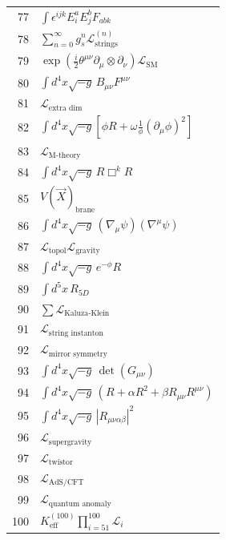 \documentclass[12pt,a4paper]{article}
\begin{document}
\begin{longtable}{r p{}}
		77 & \(\displaystyle \int \epsilon^{ijk}E_i^a E_j^b F_{ab k}\) \\
		78 & \(\displaystyle \sum_{n=0}^\infty g_s^n \mathcal{L}^{(n)}_{\text{strings}}\) \\
		79 & \(\displaystyle \exp\left(\frac{i}{2}\theta^{\mu\nu}\partial_\mu\otimes\partial_\nu\right)\mathcal{L}_{\text{SM}}\) \\
		80 & \(\displaystyle \int d^4x\sqrt{-g}\,B_{\mu\nu}F^{\mu\nu}\) \\
		81 & \(\displaystyle \mathcal{L}_{\text{extra dim}}\) \\
		82 & \(\displaystyle \int d^4x\sqrt{-g}\left[\phi R + \omega\frac{1}{\phi}(\partial_\mu\phi)^2\right]\) \\
		83 & \(\displaystyle \mathcal{L}_{\text{M-theory}}\) \\
		84 & \(\displaystyle \int d^4x\sqrt{-g}\,R\Box^k R\) \\
		85 & \(\displaystyle V(\vec{X})_{\text{brane}}\) \\
		86 & \(\displaystyle \int d^4x\sqrt{-g}\,(\nabla_\mu\psi)(\nabla^\mu\psi)\) \\
		87 & \(\displaystyle \mathcal{L}_{\text{topol}}\mathcal{L}_{\text{gravity}}\) \\
		88 & \(\displaystyle \int d^4x\sqrt{-g}\,e^{-\phi}R\) \\
		89 & \(\displaystyle \int d^5x\,R_{5D}\) \\
		90 & \(\displaystyle \sum\mathcal{L}_{\text{Kaluza-Klein}}\) \\
		91 & \(\displaystyle \mathcal{L}_{\text{string instanton}}\) \\
		92 & \(\displaystyle \mathcal{L}_{\text{mirror symmetry}}\) \\
		93 & \(\displaystyle \int d^4x\sqrt{-g}\,\det(G_{\mu\nu})\) \\
		94 & \(\displaystyle \int d^4x\sqrt{-g}\,\left(R + \alpha R^2 + \beta R_{\mu\nu}R^{\mu\nu}\right)\) \\
		95 & \(\displaystyle \int d^4x\sqrt{-g}\,|R_{\mu\nu\alpha\beta}|^2\) \\
		96 & \(\displaystyle \mathcal{L}_{\text{supergravity}}\) \\
		97 & \(\displaystyle \mathcal{L}_{\text{twistor}}\) \\
		98 & \(\displaystyle \mathcal{L}_{\text{AdS/CFT}}\) \\
		99 & \(\displaystyle \mathcal{L}_{\text{quantum anomaly}}\) \\
		100 & \(\displaystyle K^{(100)}_{\mathrm{eff}}\prod_{i=51}^{100}\mathcal{L}_i\) \\
		

\end{longtable}
\end{document}

